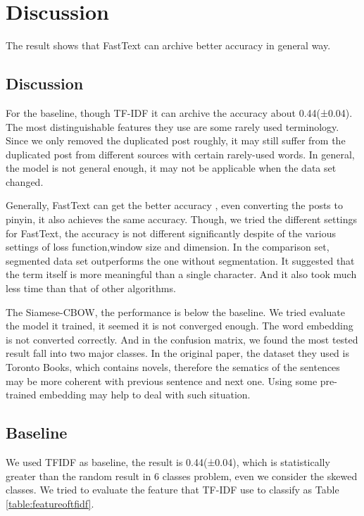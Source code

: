 \chapter{Discussion}

The result shows that FastText can archive better accuracy in general way.

\section{Discussion}


For the baseline, though TF-IDF it can archive the accuracy about 0.44(±0.04). 
The most distinguishable features they use are some rarely used terminology. 
Since we only removed the duplicated post roughly, it may still suffer from the duplicated post from different sources with certain rarely-used words. 
In general, the model is not general enough, it may not be applicable when the data set changed.

Generally, FastText can get the better accuracy , even converting the posts to pinyin,
it also achieves the same accuracy. Though, we tried the different settings for FastText,
the accuracy is not different significantly despite of the various settings of loss function,window size and dimension. In the comparison set, segmented data set outperforms the one without segmentation. 
It suggested that the term itself is more meaningful than a single character. And it also took much less time than that of other algorithms.

The Siamese-CBOW, the performance is below the baseline. 
We tried evaluate the model it trained, it seemed it is not converged enough. 
The word embedding is not converted correctly. And in the confusion matrix, we found the most tested result fall into two major classes.
In the original paper, the dataset they used is Toronto Books, which contains novels,
 therefore the sematics of the sentences may be more coherent with previous sentence and next one. Using some pre-trained embedding may help to deal with such situation. 

\section{Baseline}

We used TFIDF as baseline, the result is 0.44(±0.04), which is statistically greater than the random result in 6 classes problem, 
even we consider the skewed classes.  We tried to evaluate the feature that TF-IDF use to classify as Table \ref{table:featureoftfidf}. 

